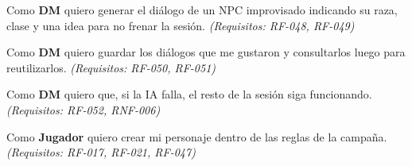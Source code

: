 \begin{description}[leftmargin=2.2cm,labelwidth=2cm,itemsep=3pt]
\item[HU-12] Como \textbf{DM} quiero generar el diálogo de un NPC improvisado indicando su raza, clase y una idea para no frenar la sesión. \textit{(Requisitos: RF-048, RF-049)}
\item[HU-13] Como \textbf{DM} quiero guardar los diálogos que me gustaron y consultarlos luego para reutilizarlos. \textit{(Requisitos: RF-050, RF-051)}
\item[HU-14] Como \textbf{DM} quiero que, si la IA falla, el resto de la sesión siga funcionando. \textit{(Requisitos: RF-052, RNF-006)}
\item[HU-15] Como \textbf{Jugador} quiero crear mi personaje dentro de las reglas de la campaña. \textit{(Requisitos: RF-017, RF-021, RF-047)}
\end{description}
